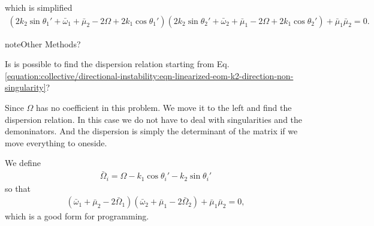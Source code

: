 \documentclass[letterpaper,12pt,english]{sphinxmanual}
\begin{document}
which is simplified
\begin{equation*}
\begin{split}(2k_2\sin\theta_1'+ \bar\omega_1+\bar\mu_2-2\Omega+2k_1\cos\theta_1')(2k_2\sin\theta_2' + \bar\omega_2 + \bar\mu_1 -2\Omega+2k_1\cos\theta_2') + \bar\mu_1\bar\mu_2 = 0.\end{split}
\end{equation*}
\begin{sphinxadmonition}{note}{Other Methods?}

Is is possible to find the dispersion relation starting from Eq. \eqref{equation:collective/directional-instability:eqn-linearized-eom-k2-direction-non-singularity}?

Since \(\Omega\) has no coefficient in this problem. We move it to the left and find the dispersion relation. In this case we do not have to deal with singularities and the demoninators. And the dispersion is simply the determinant of the matrix if we move everything to oneside.
\end{sphinxadmonition}

We define
\begin{equation*}
\begin{split}\bar\Omega_i = \Omega - k_1\cos\theta_i' - k_2\sin\theta_i'\end{split}
\end{equation*}
so that
\begin{equation*}
\begin{split}(\bar\omega_1 + \bar\mu_2 - 2\bar\Omega_1) (\bar\omega_2+\bar\mu_1 - 2\bar\Omega_2)+ \bar\mu_1\bar\mu_2=0,\end{split}
\end{equation*}
which is a good form for programming.
\end{document}
